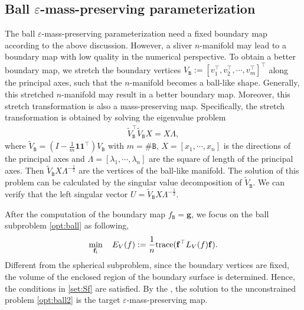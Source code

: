 \documentclass{article}
\begin{document}
\subsection{Ball $\varepsilon$-mass-preserving parameterization}

The ball $\varepsilon$-mass-preserving parameterization need a fixed boundary map according to the above discussion.
However, a sliver $n$-manifold may lead to a boundary map with low quality in the numerical perspective. To obtain a better boundary map, we stretch the boundary vertices $V_\mathtt{B} := [v_1^\top, v_2^\top, \cdots, v_m^\top]^\top$ along the principal axes, such that the $n$-manifold becomes a ball-like shape. Generally, this stretched $n$-manifold may result in a better boundary map. Moreover, this stretch transformation is also a mass-preserving map.
Specifically, the stretch transformation
is obtained by solving the eigenvalue problem
\begin{align}
    \tilde{V}_\mathtt{B}^\top \tilde{V}_\mathtt{B}X = X\Lambda,
\end{align}
where $\tilde{V}_\mathtt{B} = (I - \frac{1}{m}\mathbf{1}\mathbf{1}^\top)V_\mathtt{B}$ with $m = \# \mathtt{B}$, $X = [x_1,\cdots,x_n]$ is the directions of the principal axes and $\Lambda = [\lambda_1,\cdots,\lambda_n]$ are the square of length of the principal axes. Then $\tilde{V}_\mathtt{B}X \Lambda^{-\frac{1}{2}}$ are the vertices of the ball-like manifold. The solution of this problem can be calculated by the singular value decomposition of $\tilde{V}_\mathtt{B}$. We can verify that the left singular vector $U = \tilde{V}_\mathtt{B}X \Lambda^{-\frac{1}{2}}$.


After the computation of the boundary map $f_\mathtt{B} = \mathbf{g}$, we focus on the ball subproblem \eqref{opt:ball} as following,
\begin{align} \label{opt:ball2}
    \min_{\mathbf{f}_\mathtt{I}} \quad E_V(f):=\frac{1}{n} \mathrm{trace}(\mathbf{f}^\top L_V(f) \mathbf{f}).
\end{align}
Different from the spherical subproblem, since the boundary vertices are fixed, the volume of the enclosed region of the boundary surface is determined. Hence, the conditions in \eqref{set:Sf} are satisfied. By the , the solution to the unconstrained problem \eqref{opt:ball2} is the target $\varepsilon$-mass-preserving map.
\end{document}
